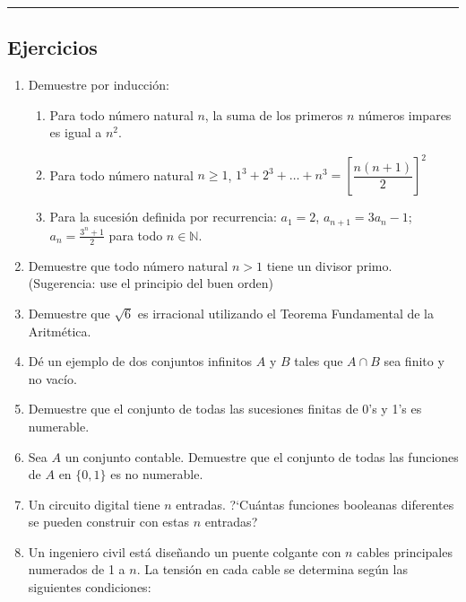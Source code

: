 \rule{\textwidth}{.5pt}

\subsection{Ejercicios}

\begin{enumerate}
\item Demuestre por inducción:
\begin{enumerate}
	\item Para todo número natural $n$, la suma de los primeros $n$ números impares es igual a $n^2$.
	\item Para todo número natural $n \geq 1$, \( 1^3 + 2^3 + \dots + n^3 = \left[ \dfrac{n(n+1)}{2} \right]^2 \)
	\item Para la sucesión definida por recurrencia: $a_1 = 2$, $a_{n+1} = 3a_n - 1$; $a_n = \frac{3^n + 1}{2}$ para todo $n \in \mathbb{N}$.
\end{enumerate}

\item Demuestre que todo número natural $n > 1$ tiene un divisor primo. (Sugerencia: use el principio del buen orden)

\item Demuestre que $\sqrt{6}$ es irracional utilizando el Teorema Fundamental de la Aritmética.

\item Dé un ejemplo de dos conjuntos infinitos $A$ y $B$ tales que $A \cap B$ sea finito y no vacío.

\item Demuestre que el conjunto de todas las sucesiones finitas de 0's y 1's es numerable.

\item Sea $A$ un conjunto contable. Demuestre que el conjunto de todas las funciones de $A$ en $\{0, 1\}$ es no numerable.

\item Un circuito digital tiene $n$ entradas. ?`Cuántas funciones booleanas diferentes se pueden construir con estas $n$ entradas?

\item Un ingeniero civil está diseñando un puente colgante con $n$ cables principales numerados de 1 a $n$. La tensión en cada cable se determina según las siguientes condiciones:


\end{enumerate}
